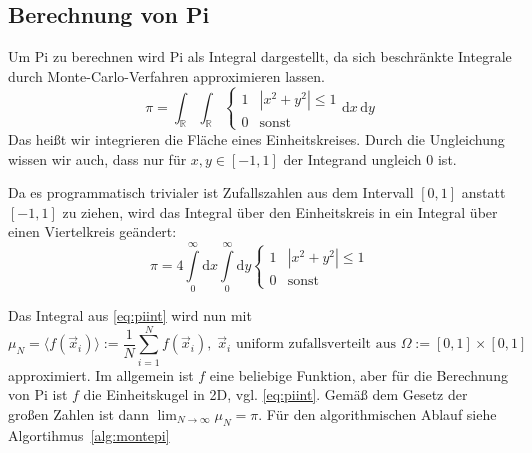 \subsection{Berechnung von Pi}

Um Pi zu berechnen wird Pi als Integral dargestellt, da sich beschränkte Integrale durch Monte-Carlo-Verfahren approximieren lassen.
\begin{equation}
	\pi = \int_\mathbb{R} \int_\mathbb{R} \begin{cases}
					1 & |x^2+y^2| \leq 1\\
					0 & \text{sonst}
			   \end{cases}
		  \mathrm{d}x\,\mathrm{d}y
\end{equation}
Das heißt wir integrieren die Fläche eines Einheitskreises. Durch die Ungleichung wissen wir auch, dass nur für $x,y\in [-1,1]$ der Integrand ungleich $0$ ist.

Da es programmatisch trivialer ist Zufallszahlen aus dem Intervall $[0,1]$ anstatt $[-1,1]$ zu ziehen, wird das Integral über den Einheitskreis in ein Integral über einen Viertelkreis geändert:
\begin{equation}
	\label{eq:piint}
	\pi = 4 \int\limits_{0}^\infty \mathrm{d}x
		    \int\limits_{0}^\infty \mathrm{d}y
		    \begin{cases}1 & |x^2+y^2| \leq 1\\0 & \text{sonst} \end{cases}
\end{equation}


Das Integral aus \autoref{eq:piint} wird nun mit
\begin{equation}
	\label{eq:pimonteint}
	\mu_N = \langle f\left( \vec{x}_i \right) \rangle := \frac{1}{N} \sum_{i=1}^N f\left( \vec{x}_i \right),\;\vec{x}_i \text{ uniform zufallsverteilt aus } \Omega:=[0,1]\times[0,1]
\end{equation}
approximiert. Im allgemein ist $f$ eine beliebige Funktion, aber für die Berechnung von Pi ist $f$ die Einheitskugel in 2D, vgl. \autoref{eq:piint}. Gemäß dem Gesetz der großen Zahlen ist dann $\lim_{N\rightarrow \infty} \mu_N = \pi$. Für den algorithmischen Ablauf siehe Algortihmus~\ref{alg:montepi}

